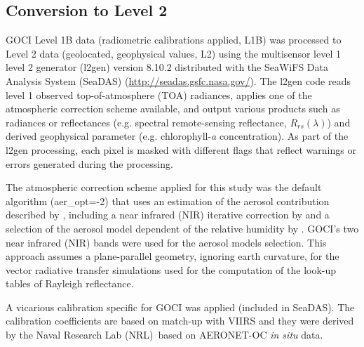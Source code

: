 \documentclass[onecolumn,3p,letterpaper,11pt]{elsarticle}
\begin{document}
\subsection{Conversion to Level 2}
GOCI Level 1B data (radiometric calibrations applied, L1B) was processed to Level 2 data (geolocated, geophysical values, L2) using the multisensor level 1 level 2 generator (l2gen) version 8.10.2 distributed with the SeaWiFS Data Analysis System (SeaDAS) (\url{http://seadas.gsfc.nasa.gov/}). The l2gen code reads level 1 observed top-of-atmosphere (TOA) radiances, applies one of the atmospheric correction scheme available, and output various products such as radiances or reflectances (e.g.  spectral remote-sensing reflectance, $R_{rs}(\lambda)$) and derived geophysical parameter (e.g. chlorophyll-{\it a} concentration). As part of the l2gen processing, each pixel is masked with different flags that reflect warnings or errors generated during the processing\citep{Bailey2006}. 

The atmospheric correction scheme applied for this study was the default algorithm ({\ttfamily aer\_opt=-2}) that uses an estimation of the aerosol contribution described by \citet{Gordon1994}, including a near infrared (NIR) iterative correction by \citet{Bailey2010} and a selection of the aerosol model dependent of the relative humidity by \citet{Ahmad2010}. GOCI's two near infrared (NIR) bands were used for the aerosol models selection. This approach assumes a plane-parallel geometry, ignoring earth curvature, for the vector radiative transfer simulations used for the computation of the look-up tables of Rayleigh reflectance.  

A vicarious calibration specific for GOCI was applied (included in SeaDAS). The calibration coefficients are based on match-up with VIIRS and they were derived by the Naval Research Lab (NRL)~based on AERONET-OC {\it in situ} data.
\end{document}

